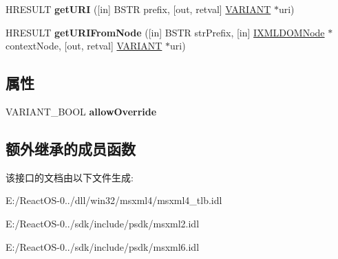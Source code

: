 \begin{DoxyCompactItemize}
H\+R\+E\+S\+U\+LT {\bfseries get\+U\+RI} (\mbox{[}in\mbox{]} B\+S\+TR prefix, \mbox{[}out, retval\mbox{]} \hyperlink{structtag_v_a_r_i_a_n_t}{V\+A\+R\+I\+A\+NT} $\ast$uri)
\item 
\mbox{\label{interface_m_s_x_m_l2_1_1_i_v_b_m_x_namespace_manager_a2a8dc2a6f2bf26ea72b66f500538a403}} 
H\+R\+E\+S\+U\+LT {\bfseries get\+U\+R\+I\+From\+Node} (\mbox{[}in\mbox{]} B\+S\+TR str\+Prefix, \mbox{[}in\mbox{]} \hyperlink{interface_m_s_x_m_l2_1_1_i_x_m_l_d_o_m_node}{I\+X\+M\+L\+D\+O\+M\+Node} $\ast$context\+Node, \mbox{[}out, retval\mbox{]} \hyperlink{structtag_v_a_r_i_a_n_t}{V\+A\+R\+I\+A\+NT} $\ast$uri)
\end{DoxyCompactItemize}
\subsection*{属性}
\begin{DoxyCompactItemize}
\item 
\mbox{\label{interface_m_s_x_m_l2_1_1_i_v_b_m_x_namespace_manager_a6c79c6dd5ffe84ad56285b624e8f5718}} 
V\+A\+R\+I\+A\+N\+T\+\_\+\+B\+O\+OL {\bfseries allow\+Override}
\end{DoxyCompactItemize}
\subsection*{额外继承的成员函数}


该接口的文档由以下文件生成\+:\begin{DoxyCompactItemize}
\item 
E\+:/\+React\+O\+S-\/0../dll/win32/msxml4/msxml4\+\_\+tlb.\+idl\item 
E\+:/\+React\+O\+S-\/0../sdk/include/psdk/msxml2.\+idl\item 
E\+:/\+React\+O\+S-\/0../sdk/include/psdk/msxml6.\+idl\end{DoxyCompactItemize}
